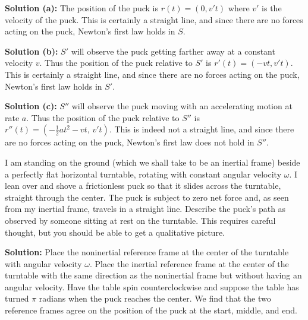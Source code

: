 \textbf{Solution (a):}
The position of the puck is $r(t) = (0, v' t)$ where $v'$ is the velocity of the puck.
This is certainly a straight line, and since there are no forces acting on the puck,
Newton's first law holds in $S$.

\textbf{Solution (b):}
$S'$ will observe the puck getting farther away at a constant velocity $v$.
Thus the position of the puck relative to $S'$ is $r'(t) = (-v t, v' t)$.
This is certainly a straight line, and since there are no forces acting on the puck,
Newton's first law holds in $S'$.

\textbf{Solution (c):}
$S''$ will observe the puck moving with an accelerating motion at rate $a$.
Thus the position of the puck relative to $S''$ is
$r''(t) = \left(-\tfrac{1}{2} a t^2 - v t,\, v' t\right)$.
This is indeed not a straight line, and since there are no forces acting on the puck,
Newton's first law does not hold in $S''$.


\begin{tcolorbox}[title=Problem 27, breakable]
    I am standing on the ground (which we shall take to be an inertial frame)
    beside a perfectly flat horizontal turntable, rotating with constant angular 
    velocity $\omega$. I lean over and shove a frictionless puck so that 
    it slides across the turntable, straight through the center.
    The puck is subject to zero net force and, as seen 
    from my inertial frame, travels in a straight line. Describe the 
    puck's path as observed by someone sitting at rest on the turntable.
    This requires careful thought, but you should be able to get a qualitative
    picture. 
\end{tcolorbox}

\textbf{Solution: } 
Place the noninertial reference frame at the center of the turntable 
    with angular velocity $\omega$.
Place the inertial reference frame at the center of the turntable 
    with the same direction as the noninertial frame but without having an angular velocity.
Have the table spin counterclockwise
    and suppose the table has turned $\pi$ radians when the puck reaches the center.
We find that the two reference frames agree on the position of the puck 
at the start, middle, and end.

